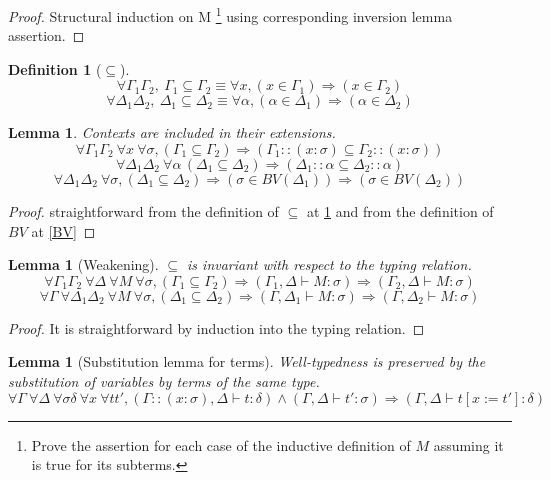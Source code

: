 \documentclass{article}
\newtheorem{lemma}[theorem]{Lemma}
\newtheorem{definition}{Definition}[section]
\begin{document}
    \begin{proof}
        Structural induction on M 
        \footnote{Prove the assertion for each case of the inductive definition of $M$ assuming it is true for its subterms.}
        using corresponding inversion lemma assertion.
    \end{proof}

    \begin{definition}[$\subseteq$]\label{subseteq}
        $$\forall \Gamma_1\Gamma_2, \ \Gamma_1\subseteq\Gamma_2 \equiv \forall x, (x \in \Gamma_1) \Rightarrow (x \in \Gamma_2)$$
        $$\forall \Delta_1\Delta_2, \ \Delta_1\subseteq\Delta_2 \equiv \forall \alpha, (\alpha \in \Delta_1) \Rightarrow (\alpha \in\Delta_2)$$
    \end{definition}

    \begin{lemma} Contexts are included in their extensions.
        $$\forall \Gamma_1\Gamma_2\ \forall x\ \forall \sigma, (\Gamma_1\subseteq\Gamma_2) \Rightarrow (\Gamma_1::(x : \sigma)\subseteq\Gamma_2::(x : \sigma))$$
        $$\forall \Delta_1\Delta_2\ \forall \alpha\, (\Delta_1\subseteq\Delta_2) \Rightarrow (\Delta_1::\alpha\subseteq\Delta_2::\alpha)$$
        $$\forall \Delta_1\Delta_2\ \forall \sigma, (\Delta_1\subseteq\Delta_2) \Rightarrow (\sigma\in BV(\Delta_1)) \Rightarrow (\sigma\in BV(\Delta_2))$$
    
    \end{lemma}
    \begin{proof}
straightforward from the definition of $\subseteq$ at \ref{subseteq} and from the definition of $BV$ at \ref{BV}  
    \end{proof}

    \begin{lemma}[Weakening]\label{weakening}$\subseteq$ is invariant with respect to the typing relation.
    $$\forall\Gamma_1\Gamma_2\ \forall\Delta\ \forall M\ \forall\sigma, (\Gamma_1\subseteq\Gamma_2) \Rightarrow (\Gamma_1, \Delta\vdash M : \sigma) \Rightarrow (\Gamma_2, \Delta\vdash M : \sigma)$$
    $$\forall\Gamma\ \forall\Delta_1\Delta_2\ \forall M\ \forall\sigma, (\Delta_1\subseteq\Delta_2) \Rightarrow (\Gamma, \Delta_1\vdash M : \sigma) \Rightarrow (\Gamma, \Delta_2\vdash M : \sigma)$$
    \end{lemma}
    \begin{proof}
It is straightforward by induction into the typing relation.        
    \end{proof}

    \begin{lemma}[Substitution lemma for terms]\label{Substitution lemma terms}
    Well-typedness is preserved by the substitution of variables by terms of the same type.
$$\forall \Gamma\ \forall\Delta\ \forall\sigma\delta\ \forall x \ \forall t t', (\Gamma :: (x : \sigma),\Delta\vdash t : \delta) \wedge (\Gamma,\Delta\vdash t' : \sigma) \Rightarrow (\Gamma,\Delta\vdash t[x:=t'] : \delta)$$        
    \end{lemma}
\end{document}
